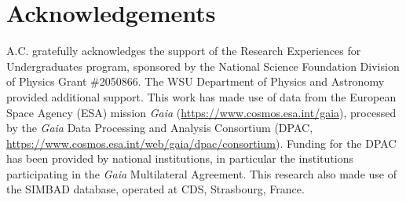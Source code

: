 \documentclass[twocolumn,times]{aastex631}
\begin{document}
\section*{Acknowledgements}
        A.C. gratefully acknowledges the support of the Research Experiences for Undergraduates program, sponsored by the National Science Foundation Division of Physics Grant \#2050866. The WSU Department of Physics and Astronomy provided additional support. This work has made use of data from the European Space Agency (ESA) mission {\it Gaia} (\url{https://www.cosmos.esa.int/gaia}), processed by the {\it Gaia} Data Processing and Analysis Consortium (DPAC, \url{https://www.cosmos.esa.int/web/gaia/dpac/consortium}). Funding for the DPAC has been provided by national institutions, in particular the institutions participating in the {\it Gaia} Multilateral Agreement. This research also made use of the SIMBAD database, operated at CDS, Strasbourg, France.


\end{document}
